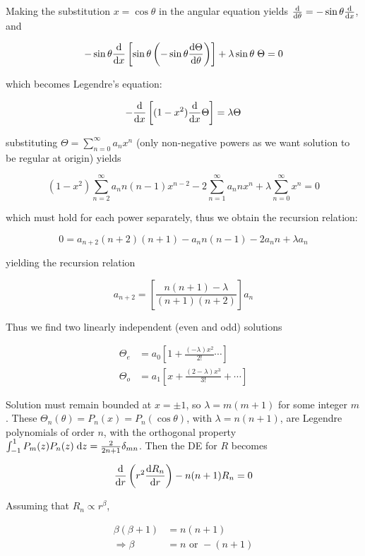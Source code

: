 \documentclass[a4paper]{article}
\begin{document}
Making the substitution $ x = \cos \theta $ in the angular equation yields $ \frac{\mathrm{d} }{\mathrm{d} \theta} = - \sin \theta \frac{\mathrm{d} }{\mathrm{d} x} $, and 

\[ - \sin \theta \frac{\mathrm{d} }{\mathrm{d} x} \left[  \sin \theta \left(  - \sin \theta \frac{\mathrm{d} \Theta}{\mathrm{d} \theta} \right)  \right] + \lambda \sin \theta \; \Theta = 0  \]

which becomes Legendre's equation: 

\[ - \frac{\mathrm{d} }{\mathrm{d} x}  \left[   (1-x^{2}) \frac{\mathrm{d} }{\mathrm{d} x}  \Theta \right]   = \lambda \Theta \]

substituting  $ \Theta = \sum_{n=0}^{\infty} a_{n} x^{n}  $ (only non-negative powers as we want solution to be regular at origin) yields

\[ (1-x^{2}) \sum_{n=2}^{\infty} a_{n} n(n-1)x^{n-2} - 2 \sum_{n=1}^{\infty} a_{n} n x^{n} + \lambda \sum_{n=0}^{\infty} x^{n} = 0  \]

which must hold for each power separately, thus we obtain the recursion relation:

\[ 0 = a_{n+2}(n+2)(n+1) - a_{n} n(n-1) - 2a_{n} n + \lambda a_{n}  \]

yielding the recursion relation

\[ a_{n+2} = \left[  \frac{n(n+1) - \lambda}{(n+1)(n+2)} \right] a_{n}  \]

Thus we find two linearly independent (even and odd) solutions

\begin{align*}
\Theta_{e} & = a_{0}  \left[  1 + \frac{(-\lambda)x^{2}}{2!} \cdots  \right]   \\
\Theta_{o} & = a_{1} \left[   x + \frac{(2 - \lambda) x^{3} }{3!} + \cdots \right]  
\end{align*}

Solution must remain bounded at $ x = \pm 1 $, so $ \lambda = m(m+1) $ for some integer $ m $. These  $ \Theta_{n}(\theta) = P_{n}(x) = P_{n} (\cos \theta )  $, with $ \lambda= n(n+1) $, are Legendre polynomials of order $ n $, with the orthogonal property $ \int_{-1}^{1} P_{m}(z)P_{n}(z) \; \mathrm{d} z = \frac{2}{2n + 1} \delta_{mn} $. Then the DE for $ R $ becomes

\[ \frac{\mathrm{d} }{\mathrm{d} r} \left(  r^{2} \frac{\mathrm{d} R_{n}}{\mathrm{d} r} \right) - n(n+1) R_{n} = 0   \]

Assuming that $ R_{n} \propto r^{\beta} $,

\begin{align*}
\beta (\beta + 1) & = n(n+1) \\
\Rightarrow \beta & = n \text{ or } -(n+1) 
\end{align*}
\end{document}
